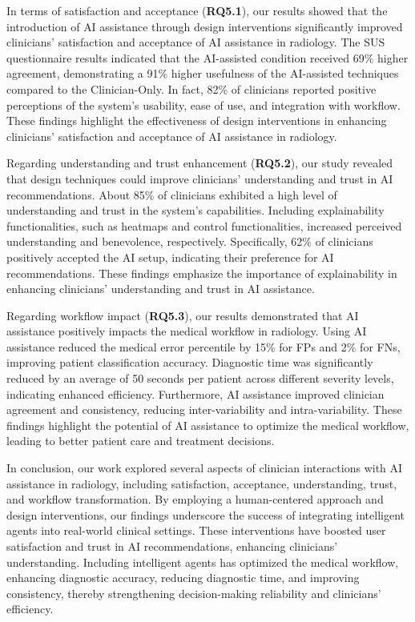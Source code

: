 In terms of satisfaction and acceptance ({\bf RQ5.1}), our results showed that the introduction of \ac{AI} assistance through design interventions significantly improved clinicians' satisfaction and acceptance of \ac{AI} assistance in radiology.
The \ac{SUS} questionnaire results indicated that the \ac{AI}-assisted condition received 69\% higher agreement, demonstrating a 91\% higher usefulness of the \ac{AI}-assisted techniques compared to the Clinician-Only.
In fact, 82\% of clinicians reported positive perceptions of the system's usability, ease of use, and integration with workflow.
These findings highlight the effectiveness of design interventions in enhancing clinicians' satisfaction and acceptance of \ac{AI} assistance in radiology.

Regarding understanding and trust enhancement ({\bf RQ5.2}), our study revealed that design techniques could improve clinicians' understanding and trust in \ac{AI} recommendations.
About 85\% of clinicians exhibited a high level of understanding and trust in the system's capabilities.
Including explainability functionalities, such as heatmaps and control functionalities, increased perceived understanding and benevolence, respectively.
Specifically, 62\% of clinicians positively accepted the \ac{AI} setup, indicating their preference for \ac{AI} recommendations.
These findings emphasize the importance of explainability in enhancing clinicians' understanding and trust in \ac{AI} assistance.

Regarding workflow impact ({\bf RQ5.3}), our results demonstrated that \ac{AI} assistance positively impacts the medical workflow in radiology.
Using \ac{AI} assistance reduced the medical error percentile by 15\% for \acp{FP} and 2\% for \acp{FN}, improving patient classification accuracy.
Diagnostic time was significantly reduced by an average of 50 seconds per patient across different severity levels, indicating enhanced efficiency.
Furthermore, \ac{AI} assistance improved clinician agreement and consistency, reducing inter-variability and intra-variability.
These findings highlight the potential of \ac{AI} assistance to optimize the medical workflow, leading to better patient care and treatment decisions.

In conclusion, our work explored several aspects of clinician interactions with \ac{AI} assistance in radiology, including satisfaction, acceptance, understanding, trust, and workflow transformation.
By employing a human-centered approach and design interventions, our findings underscore the success of integrating intelligent agents into real-world clinical settings.
These interventions have boosted user satisfaction and trust in \ac{AI} recommendations, enhancing clinicians' understanding.
Including intelligent agents has optimized the medical workflow, enhancing diagnostic accuracy, reducing diagnostic time, and improving consistency, thereby strengthening decision-making reliability and clinicians' efficiency.

